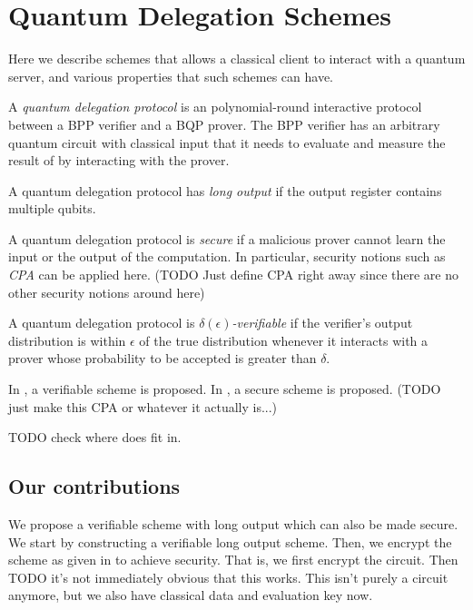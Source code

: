 \section{Quantum Delegation Schemes}

Here we describe schemes that allows a classical client to interact with a quantum server, and various properties that such schemes can have.

\begin{definition}
	A \emph{quantum delegation protocol} is an polynomial-round interactive protocol between a BPP verifier and a BQP prover. The BPP verifier has an arbitrary quantum circuit with classical input that it needs to evaluate and measure the result of by interacting with the prover.
\end{definition}

\begin{definition}
	A quantum delegation protocol has \emph{long output} if the output register contains multiple qubits.
\end{definition}

\begin{definition}
	A quantum delegation protocol is \emph{secure} if a malicious prover cannot learn the input or the output of the computation. In particular, security notions such as \emph{CPA} can be applied here. (TODO Just define CPA right away since there are no other security notions around here)
\end{definition}

\begin{definition}
	A quantum delegation protocol is \emph{$\delta(\epsilon)$-verifiable} if the verifier's output distribution is within $\epsilon$ of the true distribution whenever it interacts with a prover whose probability to be accepted is greater than $\delta$.
\end{definition}

In \cite{mahadev_delegation}, a verifiable scheme is proposed. In \cite{mahadev_qfhe}, a secure scheme is proposed. (TODO just make this CPA or whatever it actually is...) 

TODO check where does \cite{1904.06320} fit in.

\subsection{Our contributions}

We propose a verifiable scheme with long output which can also be made secure. We start by constructing a verifiable long output scheme. Then, we encrypt the scheme as given in \cite{mahadev_delegation} to achieve security. That is, we first encrypt the circuit. Then TODO it's not immediately obvious that this works. This isn't purely a circuit anymore, but we also have classical data and evaluation key now.
